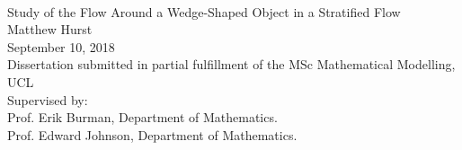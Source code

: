 \documentclass[12pt]{article}
\begin{document}
\AddToShipoutPicture*{\BackgroundPic}

\begin{center}
\mbox{}\\[5em]
{\LARGE Study of the Flow Around a Wedge-Shaped Object in a Stratified Flow}\\[3em]
{\large Matthew Hurst}\\[3em]
September 10, 2018\\[6em]
Dissertation submitted in partial fulfillment 
of the MSc Mathematical Modelling, UCL\\[6em]
Supervised by:\\[1em]
Prof. Erik Burman, Department of Mathematics.\\[2em]
Prof. Edward Johnson, Department of Mathematics.
\end{center}

\newpage
\end{document}
